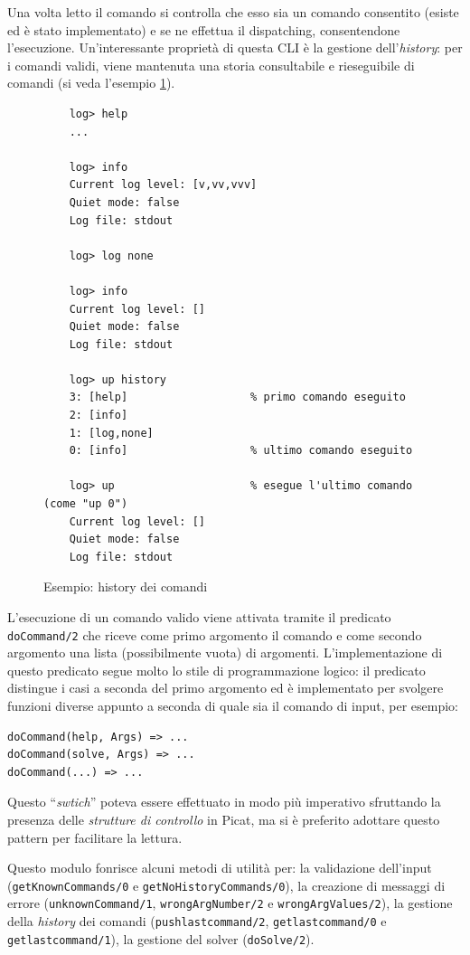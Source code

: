 \documentclass[12pt,a4paper,openright]{book} %
\begin{document}
Una volta letto il comando si controlla che esso sia un comando consentito (esiste ed è stato implementato) e se ne effettua il dispatching, consentendone l'esecuzione. Un'interessante proprietà di questa CLI è la gestione dell'\textit{history}: per i comandi validi, viene mantenuta una storia consultabile e rieseguibile di comandi (si veda l'esempio \ref{fig:example_commandshistory}).

\begin{figure}
	\begin{verbatim}
	log> help
	...
	
	log> info
	Current log level: [v,vv,vvv]
	Quiet mode: false
	Log file: stdout
	
	log> log none
	
	log> info
	Current log level: []
	Quiet mode: false
	Log file: stdout
	
	log> up history
	3: [help]                   % primo comando eseguito
	2: [info]
	1: [log,none]
	0: [info]                   % ultimo comando eseguito
	
	log> up                     % esegue l'ultimo comando (come "up 0")
	Current log level: []
	Quiet mode: false
	Log file: stdout
	\end{verbatim}
	\caption{Esempio: history dei comandi}
	\label{fig:example_commandshistory}
\end{figure}

L'esecuzione di un comando valido viene attivata tramite il predicato \texttt{doCommand/2} che riceve come primo argomento il comando e come secondo argomento una lista (possibilmente vuota) di argomenti. L'implementazione di questo predicato segue molto lo stile di programmazione logico: il predicato distingue i casi a seconda del primo argomento ed è implementato per svolgere funzioni diverse appunto a seconda di quale sia il comando di input, per esempio:
\begin{verbatim}
doCommand(help, Args) => ...
doCommand(solve, Args) => ...
doCommand(...) => ...
\end{verbatim}
Questo ``\textit{swtich}'' poteva essere effettuato in modo più imperativo sfruttando la presenza delle \textit{strutture di controllo} in Picat, ma si è preferito adottare questo pattern per facilitare la lettura.

Questo modulo fonrisce alcuni metodi di utilità per: la validazione dell'input (\texttt{getKnownCommands/0} e \texttt{getNoHistoryCommands/0}), la creazione di messaggi di errore (\texttt{unknownCommand/1}, \texttt{wrongArgNumber/2} e \texttt{wrongArgValues/2}), la gestione della \textit{history} dei comandi (\texttt{push\textunderscore last\textunderscore command/2}, \texttt{get\textunderscore last\textunderscore command/0} e \texttt{get\textunderscore last\textunderscore command/1}), la gestione del solver (\texttt{doSolve/2}).
\end{document}
